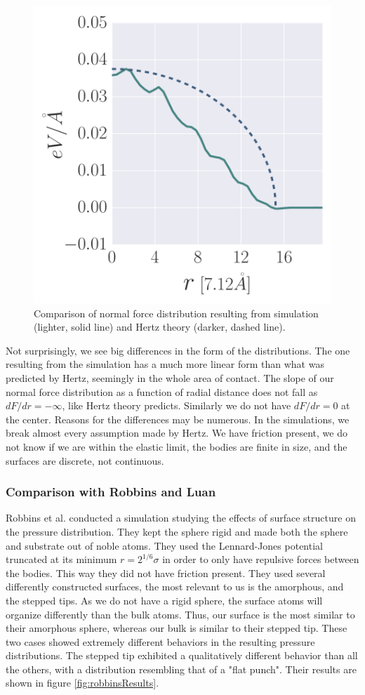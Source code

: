 \documentclass[twoside,english]{uiofysmaster}
\begin{document}
\begin{figure}[H]
\centering
\includegraphics[width=0.5\linewidth]{figures/forceDistribution/HertzCompare}
\caption{Comparison of normal force distribution resulting from simulation (lighter, solid line) and Hertz theory (darker, dashed line).}
\label{fig:HertzCompare}
\end{figure}


Not surprisingly, we see big differences in the form of the distributions. 
The one resulting from the simulation has a much more linear form than what was predicted by Hertz, seemingly in the whole area of contact.
The slope of our normal force distribution as a function of radial distance does not fall as \\$dF/dr=-\infty$, like Hertz theory predicts.
Similarly we do not have $dF/dr=0$ at the center.
Reasons for the differences may be numerous. 
In the simulations, we break almost every assumption made by Hertz.
We have friction present, we do not know if we are within the elastic limit, the bodies are finite in size, and the surfaces are discrete, not continuous. 


\subsubsection*{Comparison with Robbins and Luan}
Robbins et al. conducted a simulation \cite{RobbinsSingleAsperity} studying the effects of surface structure on the pressure distribution.
They kept the sphere rigid and made both the sphere and substrate out of noble atoms.  
They used the Lennard-Jones potential truncated at its minimum $r=2^{1/6}\sigma$ in order to only have repulsive forces between the bodies. 
This way they did not have friction present.
They used several differently constructed surfaces, the most relevant to us is the amorphous, and the stepped tips. 
As we do not have a rigid sphere, the surface atoms will organize differently than the bulk atoms.
Thus, our surface is the most similar to their amorphous sphere, 
whereas our bulk is similar to their stepped tip. 
These two cases showed extremely different behaviors in the resulting pressure distributions.
The stepped tip exhibited a qualitatively different behavior than all the others, with a distribution resembling that of a "flat punch".
Their results are shown in figure \ref{fig:robbinsResults}.
\end{document}
